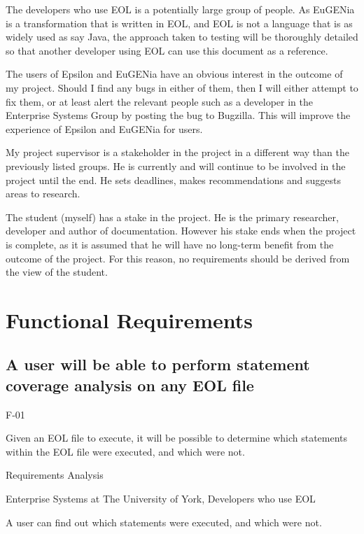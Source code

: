 The developers who use EOL is a potentially large group of people. As EuGENia is a transformation that is written in EOL, and EOL is not a language that is as widely used as say Java, the approach taken to testing will be thoroughly detailed so that another developer using EOL can use this document as a reference.

The users of Epsilon and EuGENia have an obvious interest in the outcome of my project. Should I find any bugs in either of them, then I will either attempt to fix them, or at least alert the relevant people such as a developer in the Enterprise Systems Group by posting the bug to Bugzilla. This will improve the experience of Epsilon and EuGENia for users.

My project supervisor is a stakeholder in the project in a different way than the previously listed groups. He is currently and will continue to be involved in the project until the end. He sets deadlines, makes recommendations and suggests areas to research.

The student (myself) has a stake in the project. He is the primary researcher, developer and author of documentation. However his stake ends when the project is complete, as it is assumed that he will have no long-term benefit from the outcome of the project. For this reason, no requirements should be derived from the view of the student.

\section{Functional Requirements}

\subsection{A user will be able to perform statement coverage analysis on any EOL file}
\begin{description}[style=sameline,leftmargin=4.5cm,nolistsep]
\item[\hspace*{0.3cm}Label] F-01
\item[\hspace*{0.3cm}Description] Given an EOL file to execute, it will be possible to determine which statements within the EOL file were executed, and which were not.
\item[\hspace*{0.3cm}Source] Requirements Analysis
\item[\hspace*{0.3cm}Stakeholders] Enterprise Systems at The University of York, Developers who use EOL
\item[\hspace*{0.3cm}Satisfiable Conditions] A user can find out which statements were executed, and which were not.
\end{description}

